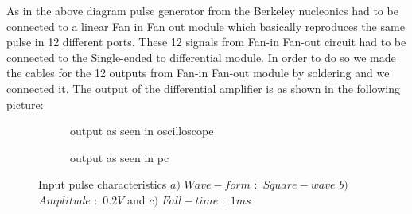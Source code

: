 \documentclass[a4paper, 11pt]{article}
\begin{document}
As in the above diagram pulse generator from the Berkeley nucleonics had to be connected to a linear Fan in Fan out module which basically reproduces the same pulse in 12 different ports. These 12 signals from Fan-in Fan-out circuit had to be connected to the Single-ended to differential module. In order to do so we made the cables for the 12 outputs from Fan-in Fan-out module by soldering and we connected it. The output of the differential amplifier is as shown in the following picture:


\begin{figure}[h]
 
\begin{subfigure}{0.5\textwidth}
\caption{output as seen in oscilloscope}
\label{fig:subim1}
\end{subfigure}
\begin{subfigure}{0.5\textwidth}
\caption{output as seen in pc}
\label{fig:subim2}
\end{subfigure}
 
\caption{Input pulse characteristics $a)$ $Wave-form$ $:$ $Square-wave$ \newline $b)$ $Amplitude$ $:$ $0.2V$ and $c)$ $Fall-time$ $:$ $1ms$}
\label{fig:image2}
\end{figure}

         
         
         
\end{document}
